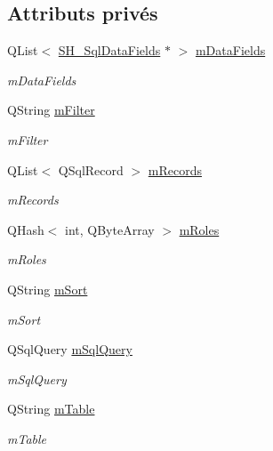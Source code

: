 \subsection*{Attributs privés}
\begin{DoxyCompactItemize}
\item 
Q\-List$<$ \hyperlink{classSH__SqlDataFields}{S\-H\-\_\-\-Sql\-Data\-Fields} $\ast$ $>$ \hyperlink{classSH__SqlDataModel_a3e998f75dd5b3193783612002461888d}{m\-Data\-Fields}
\begin{DoxyCompactList}\small\item\em m\-Data\-Fields \end{DoxyCompactList}\item 
Q\-String \hyperlink{classSH__SqlDataModel_af83c15ae3ad1dc4617dd58f2a852a1e2}{m\-Filter}
\begin{DoxyCompactList}\small\item\em m\-Filter \end{DoxyCompactList}\item 
Q\-List$<$ Q\-Sql\-Record $>$ \hyperlink{classSH__SqlDataModel_aa58096989daac3cd3fdea5e6dd4f27ee}{m\-Records}
\begin{DoxyCompactList}\small\item\em m\-Records \end{DoxyCompactList}\item 
Q\-Hash$<$ int, Q\-Byte\-Array $>$ \hyperlink{classSH__SqlDataModel_ad1e46c72a6aeb83e3e7bb0c3110d12a4}{m\-Roles}
\begin{DoxyCompactList}\small\item\em m\-Roles \end{DoxyCompactList}\item 
Q\-String \hyperlink{classSH__SqlDataModel_a7e36fd116b7cb50e949ee56af0c31772}{m\-Sort}
\begin{DoxyCompactList}\small\item\em m\-Sort \end{DoxyCompactList}\item 
Q\-Sql\-Query \hyperlink{classSH__SqlDataModel_a54f0cf057e3200f6b199508958e43fec}{m\-Sql\-Query}
\begin{DoxyCompactList}\small\item\em m\-Sql\-Query \end{DoxyCompactList}\item 
Q\-String \hyperlink{classSH__SqlDataModel_a88b8738a0d2803c94295c90c83d65f32}{m\-Table}
\begin{DoxyCompactList}\small\item\em m\-Table \end{DoxyCompactList}\end{DoxyCompactItemize}


